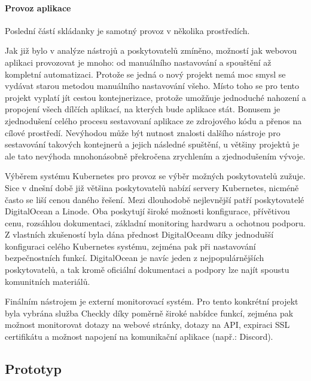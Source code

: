 			\paragraph{Provoz aplikace}

			Poslední částí skládanky je samotný provoz v několika prostředích.

			Jak již bylo v analýze nástrojů a poskytovatelů zmíněno, možností jak webovou aplikaci provozovat je mnoho: od
			manuálního nastavování a spouštění až kompletní automatizaci.
			Protože se jedná o nový projekt nemá moc smysl se vydávat starou metodou manuálního nastavování všeho.
			Místo toho se pro tento projekt vyplatí jít cestou kontejnerizace, protože umožňuje jednoduché nahození a propojení
			všech dílčích aplikací, na kterých bude aplikace stát.
			Bonusem je zjednodušení celého procesu sestavovaní aplikace ze zdrojového kódu a přenos
			na cílové prostředí.
			Nevýhodou může být nutnost znalosti dalšího nástroje pro sestavování takových kontejnerů a jejich následné spuštění, u většiny
			projektů je ale tato nevýhoda mnohonásobně překročena zrychlením a zjednodušením vývoje.

			Výběrem systému Kubernetes pro provoz se výběr možných poskytovatelů zužuje.
			Sice v dnešní době již většina poskytovatelů nabízí servery Kubernetes, nicméně často se liší cenou daného řešení.
			Mezi dlouhodobě nejlevnější patří poskytovatelé DigitalOcean a Linode.
			Oba poskytují široké možnosti konfigurace, přívětivou cenu, rozsáhlou dokumentaci, základní monitoring hardwaru
			a ochotnou podporu.
			Z vlastních zkušeností byla dána přednost DigitalOceanu díky jednodušší konfiguraci celého Kubernetes systému,
			zejména pak při nastavování bezpečnostních funkcí.
			DigitalOcean je navíc jeden z nejpopulárnějších poskytovatelů, a tak kromě oficiální dokumentaci a podpory lze
			najít spoustu komunitních materiálů.

			Finálním nástrojem je externí monitorovací systém.
			Pro tento konkrétní projekt byla vybrána služba Checkly díky poměrně široké nabídce funkcí, zejména pak
			možnost monitorovat dotazy na webové stránky, dotazy na \ac{API}, expiraci SSL certifikátu a možnost napojení na
			komunikační aplikace (např.: Discord).

	\subsection{Prototyp}

